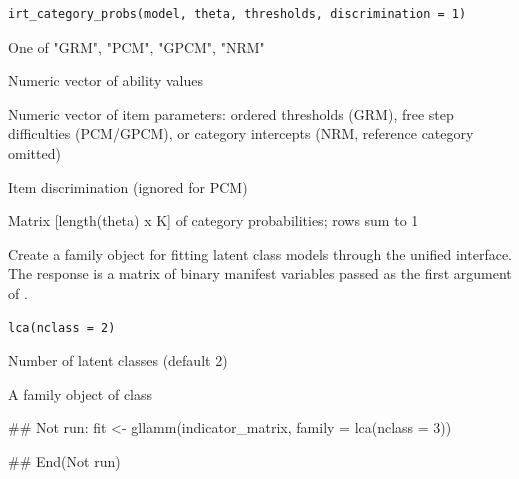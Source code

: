 \documentclass[a4paper]{book}
\begin{document}
%
\begin{Usage}
\begin{verbatim}
irt_category_probs(model, theta, thresholds, discrimination = 1)
\end{verbatim}
\end{Usage}
%
\begin{Arguments}
\begin{ldescription}
\item[\code{model}] One of "GRM", "PCM", "GPCM", "NRM"

\item[\code{theta}] Numeric vector of ability values

\item[\code{thresholds}] Numeric vector of item parameters: ordered thresholds
(GRM), free step difficulties (PCM/GPCM), or category intercepts (NRM,
reference category omitted)

\item[\code{discrimination}] Item discrimination (ignored for PCM)
\end{ldescription}
\end{Arguments}
%
\begin{Value}
Matrix [length(theta) x K] of category probabilities; rows sum to 1
\end{Value}
%
\begin{Description}
Create a family object for fitting latent class models through the unified
 interface. The response is a matrix of binary manifest
variables passed as the first argument of .
\end{Description}
%
\begin{Usage}
\begin{verbatim}
lca(nclass = 2)
\end{verbatim}
\end{Usage}
%
\begin{Arguments}
\begin{ldescription}
\item[\code{nclass}] Number of latent classes (default 2)
\end{ldescription}
\end{Arguments}
%
\begin{Value}
A family object of class 
\end{Value}
%
\begin{Examples}
\begin{ExampleCode}
## Not run: 
fit <- gllamm(indicator_matrix, family = lca(nclass = 3))

## End(Not run)

\end{ExampleCode}
\end{Examples}
\end{document}
